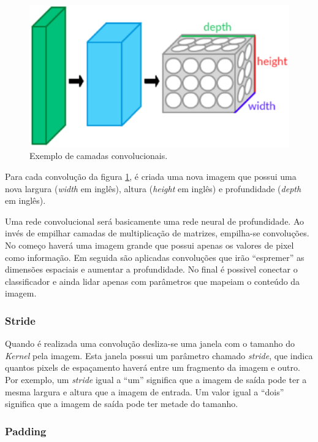 \begin{figure}[H]
\centering
\includegraphics[scale=0.6]{imagens/Conv_layers.eps}
\caption{Exemplo de camadas convolucionais.}
\label{fig:convolution_kernel}
\end{figure}

Para cada convolução da figura \ref{fig:convolution_kernel}, é criada uma
nova imagem que possui uma nova largura (\textit{width} em inglês),
altura (\textit{height} em inglês) e profundidade (\textit{depth} em
inglês).

Uma rede convolucional\cite{Dumoulin2016} será basicamente uma rede
neural de profundidade. Ao invés de empilhar camadas de multiplicação
de matrizes, empilha-se convoluções. No começo haverá uma imagem
grande que possui apenas os valores de pixel como informação. Em
seguida são aplicadas convoluções que irão ``espremer'' as dimensões
espaciais e aumentar a profundidade. No final é possivel conectar o
classificador e ainda lidar apenas com parâmetros que mapeiam o
conteúdo da imagem.

\subsubsection{Stride}

Quando é realizada uma convolução desliza-se uma janela com o
tamanho do \textit{Kernel} pela imagem. Esta janela possui um 
parâmetro chamado \textit{stride}\cite{Dumoulin2016}, que indica
quantos pixels de espaçamento haverá entre um fragmento da imagem e
outro. Por exemplo, um \textit{stride} igual a ``um'' significa que a
imagem de saída pode ter a mesma largura e altura que a imagem de
entrada. Um valor igual a ``dois'' significa que a imagem de saída
pode ter metade do tamanho.

\subsubsection{Padding}

